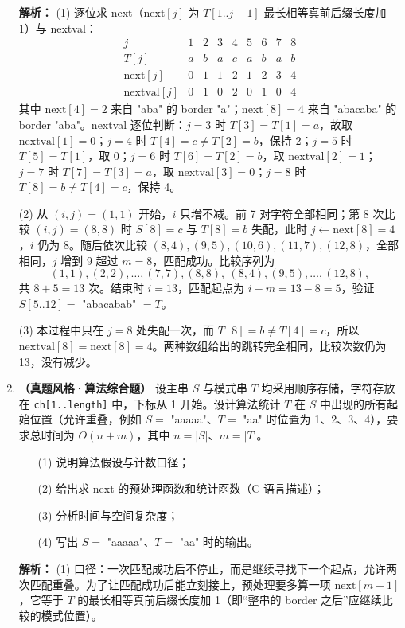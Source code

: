 \begin{enumerate}[resume]
\ifshowsolutions\par\noindent\textbf{解析：}
(1) 逐位求 next（$\mathrm{next}[j]$ 为 $T[1..j-1]$ 最长相等真前后缀长度加 1）与 nextval：
\[
\begin{array}{c|cccccccc}
j&1&2&3&4&5&6&7&8\\ \hline
T[j]&a&b&a&c&a&b&a&b\\
\mathrm{next}[j]&0&1&1&2&1&2&3&4\\
\mathrm{nextval}[j]&0&1&0&2&0&1&0&4
\end{array}
\]
其中 $\mathrm{next}[4]=2$ 来自 "aba" 的 border "a"；$\mathrm{next}[8]=4$ 来自 "abacaba" 的 border "aba"。nextval 逐位判断：$j=3$ 时 $T[3]=T[1]=a$，故取 $\mathrm{nextval}[1]=0$；$j=4$ 时 $T[4]=c\neq T[2]=b$，保持 2；$j=5$ 时 $T[5]=T[1]$，取 0；$j=6$ 时 $T[6]=T[2]=b$，取 $\mathrm{nextval}[2]=1$；$j=7$ 时 $T[7]=T[3]=a$，取 $\mathrm{nextval}[3]=0$；$j=8$ 时 $T[8]=b\neq T[4]=c$，保持 4。

(2) 从 $(i,j)=(1,1)$ 开始，$i$ 只增不减。前 7 对字符全部相同；第 8 次比较 $(i,j)=(8,8)$ 时 $S[8]=c$ 与 $T[8]=b$ 失配，此时 $j\leftarrow \mathrm{next}[8]=4$，$i$ 仍为 8。随后依次比较 $(8,4),(9,5),(10,6),(11,7),(12,8)$，全部相同，$j$ 增到 9 超过 $m=8$，匹配成功。比较序列为
\[
(1,1),(2,2),\ldots,(7,7),(8,8),\ (8,4),(9,5),\ldots,(12,8),
\]
共 $8+5=13$ 次。结束时 $i=13$，匹配起点为 $i-m=13-8=5$，验证 $S[5..12]=$ "abacabab" $=T$。

(3) 本过程中只在 $j=8$ 处失配一次，而 $T[8]=b\neq T[4]=c$，所以 $\mathrm{nextval}[8]=\mathrm{next}[8]=4$。两种数组给出的跳转完全相同，比较次数仍为 13，没有减少。
\else \answerarea[10] \fi

\item \textbf{（真题风格·算法综合题）} 设主串 $S$ 与模式串 $T$ 均采用顺序存储，字符存放在 \texttt{ch[1..length]} 中，下标从 1 开始。设计算法统计 $T$ 在 $S$ 中出现的所有起始位置（允许重叠，例如 $S=$ "aaaaa"、$T=$ "aa" 时位置为 1、2、3、4），要求总时间为 $O(n+m)$，其中 $n=|S|$、$m=|T|$。
\begin{enumerate}
\item[(1)] 说明算法假设与计数口径；
\item[(2)] 给出求 next 的预处理函数和统计函数（C 语言描述）；
\item[(3)] 分析时间与空间复杂度；
\item[(4)] 写出 $S=$ "aaaaa"、$T=$ "aa" 时的输出。
\end{enumerate}

\ifshowsolutions\par\noindent\textbf{解析：}
(1) 口径：一次匹配成功后不停止，而是继续寻找下一个起点，允许两次匹配重叠。为了让匹配成功后能立刻接上，预处理要多算一项 $\mathrm{next}[m+1]$，它等于 $T$ 的最长相等真前后缀长度加 1（即“整串的 border 之后”应继续比较的模式位置）。


\end{enumerate}
